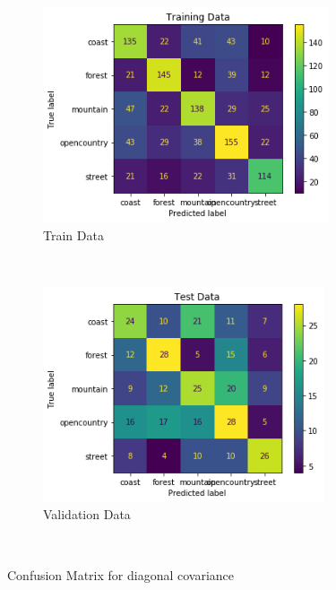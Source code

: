 \newpage
\begin{figure}[!t]
    \centering
    \begin{subfigure}[t]{0.5\textwidth}
        \centering
        \includegraphics[height=2.5in]{Dataset_2a/diagonal covariance train confusion matrix.png}
        \caption{Train Data}
    \end{subfigure}%
    ~ 
    \begin{subfigure}[t]{0.5\textwidth}
        \centering
        \includegraphics[height=2.5in]{Dataset_2a/diagonal covariance test confusion matrix.png} 
        \caption{Validation Data}
    \end{subfigure}%
    ~
    \caption{Confusion Matrix for diagonal covariance}
    \label{fig:28}
\end{figure}

